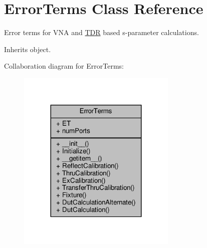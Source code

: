 \hypertarget{classSignalIntegrity_1_1Measurement_1_1Calibration_1_1ErrorTerms_1_1ErrorTerms}{}\section{Error\+Terms Class Reference}
\label{classSignalIntegrity_1_1Measurement_1_1Calibration_1_1ErrorTerms_1_1ErrorTerms}


Error terms for V\+NA and \hyperlink{namespaceSignalIntegrity_1_1Measurement_1_1TDR}{T\+DR} based s-\/parameter calculations.  




Inherits object.



Collaboration diagram for Error\+Terms\+:\nopagebreak
\begin{figure}[H]
\begin{center}
\leavevmode
\includegraphics[width=215pt]{classSignalIntegrity_1_1Measurement_1_1Calibration_1_1ErrorTerms_1_1ErrorTerms__coll__graph}
\end{center}
\end{figure}

